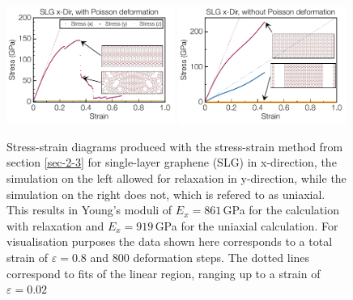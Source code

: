 \documentclass[preprint,12pt]{elsarticle}
\begin{document}
\begin{figure}[ht!]
\centering
\includegraphics[width=0.49\textwidth]{YM4CNM-f-4a.pdf}
\includegraphics[width=0.49\textwidth]{YM4CNM-f-4b.pdf}
\caption{Stress-strain diagrams produced with the stress-strain method from section \ref{sec-2-3} 
for single-layer graphene (SLG) in x-direction, the simulation on the left allowed 
for relaxation in y-direction, while the simulation on the right does not, 
which is refered to as uniaxial. This results in Young's moduli of $E_x=861$\,GPa 
for the calculation with relaxation and $E_x=919$\,GPa for the uniaxial calculation. 
For visualisation purposes the data shown here corresponds to a total strain 
of $\varepsilon = 0.8$ and 800 deformation steps. 
The dotted lines correspond to fits of the linear region, 
ranging up to a strain of $\varepsilon = 0.02$ \label{SLG_relax}}
\end{figure}
\end{document}
